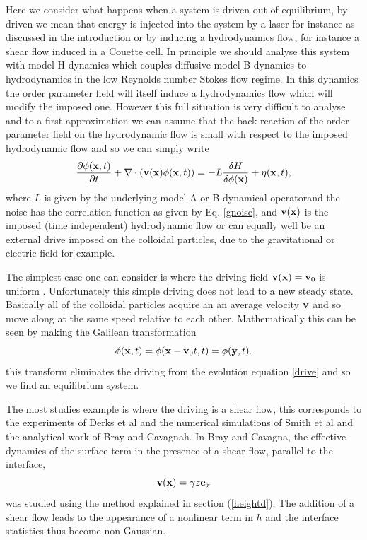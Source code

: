 Here we consider what happens when a system is driven out of equilibrium, by driven we mean that energy is injected into the system by a laser for instance as discussed in the introduction or by inducing a hydrodynamics flow, for instance a shear flow induced in a Couette cell. In principle we should analyse this system with model H dynamics which couples diffusive model B dynamics to hydrodynamics in the low Reynolds number Stokes flow regime. In this dynamics the order parameter field will itself induce a hydrodynamics flow which will modify
the imposed one. However this full situation is very difficult to analyse and to a first approximation we can assume that the back reaction of the order parameter field on the hydrodynamic flow is small with respect to the imposed hydrodynamic flow and so we can simply write
\begin{equation}
    \frac{\partial \phi ({\bf x},t)}{\partial t} + \nabla\cdot({\bf  v}({\bf x})\phi({\bf x},t)) =- L\frac{\delta H}{\delta \phi({\bf x})} + \eta({\bf x},t),
    \label{drive}
\end{equation}
where $L$ is given by the underlying model A or B dynamical operatorand the noise has the correlation function as given by Eq. \eqref{gnoise}, and ${\bf v}({\bf x})$ is the imposed (time independent) hydrodynamic flow or can equally well be an external drive imposed on the colloidal particles, due to the gravitational or electric field for example. 

The simplest case one can consider is where the driving field ${\bf v}({\bf x}) ={\bf v}_0$ is uniform . Unfortunately this simple driving does not lead to a new steady state. Basically all of the colloidal particles acquire an an average velocity ${\bf v}$ and so move along at the same speed relative to each other. Mathematically this can be seen by making the Galilean transformation
\begin{equation}
    \phi ({\bf x},t)= \phi({\bf x}-{\bf v}_0t,t) = \phi({\bf y},t).
\end{equation}
this transform eliminates the driving from the evolution equation \eqref{drive} and so we find an equilibrium system. 

The most studies example is where the driving is a shear flow, this corresponds to the experiments of Derks et al and the numerical simulations of Smith et al and the analytical work
of Bray and Cavagnah. In Bray and Cavagna, the effective dynamics of the surface term 
in the presence of a shear flow, parallel to the interface,
\begin{equation}
    {\bf v}({\bf x}) = \gamma z {\bf e}_x
\end{equation}
was studied using the method explained in section (\ref{heightd}). The addition of a shear flow leads to the appearance of a nonlinear term in $h$ and the interface statistics thus become non-Gaussian.

